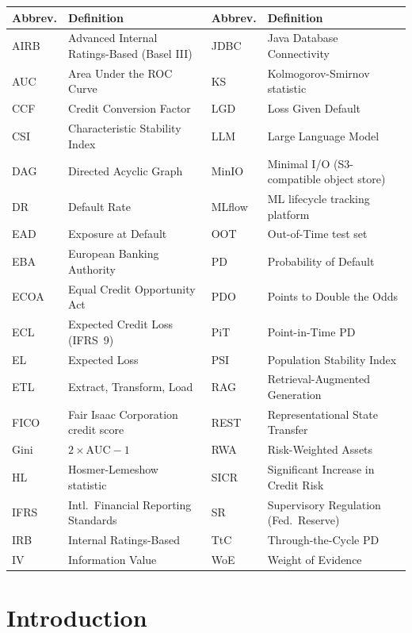 \documentclass[12pt,a4paper]{report}
\begin{document}
\begin{tabular}{@{}lp{5.0cm}@{\hspace{1.2cm}}lp{5.0cm}@{}}
\toprule
\textbf{Abbrev.} & \textbf{Definition} &
\textbf{Abbrev.} & \textbf{Definition} \\
\midrule
AIRB   & Advanced Internal Ratings-Based (Basel III) &
JDBC   & Java Database Connectivity \\
AUC    & Area Under the ROC Curve &
KS     & Kolmogorov-Smirnov statistic \\
CCF    & Credit Conversion Factor &
LGD    & Loss Given Default \\
CSI    & Characteristic Stability Index &
LLM    & Large Language Model \\
DAG    & Directed Acyclic Graph &
MinIO  & Minimal I/O (S3-compatible object store) \\
DR     & Default Rate &
MLflow & ML lifecycle tracking platform \\
EAD    & Exposure at Default &
OOT    & Out-of-Time test set \\
EBA    & European Banking Authority &
PD     & Probability of Default \\
ECOA   & Equal Credit Opportunity Act &
PDO    & Points to Double the Odds \\
ECL    & Expected Credit Loss (IFRS~9) &
PiT    & Point-in-Time PD \\
EL     & Expected Loss &
PSI    & Population Stability Index \\
ETL    & Extract, Transform, Load &
RAG    & Retrieval-Augmented Generation \\
FICO   & Fair Isaac Corporation credit score &
REST   & Representational State Transfer \\
Gini   & $2 \times \mathrm{AUC} - 1$ &
RWA    & Risk-Weighted Assets \\
HL     & Hosmer-Lemeshow statistic &
SICR   & Significant Increase in Credit Risk \\
IFRS   & Intl.\ Financial Reporting Standards &
SR     & Supervisory Regulation (Fed.\ Reserve) \\
IRB    & Internal Ratings-Based &
TtC    & Through-the-Cycle PD \\
IV     & Information Value &
WoE    & Weight of Evidence \\
\bottomrule
\end{tabular}

\chapter{Introduction}
\end{document}
